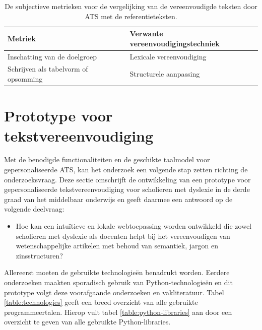 \begin{center}
	\begin{table}[H]
		\begin{tabular}{ | m{7cm} | m{7cm} | } 
			\hline
			\textbf{Metriek} & \textbf{Verwante vereenvoudigingstechniek} \\
			\hline
			Inschatting van de doelgroep & Lexicale vereenvoudiging \\
			\hline
			Schrijven als tabelvorm of opsomming & Structurele aanpassing \\
			\hline
		\end{tabular}
	\caption{De subjectieve metrieken voor de vergelijking van de vereenvoudigde teksten door ATS met de referentieteksten.}
	\label{table:verg-studie-reftekst-metrieken}
	\end{table}
\end{center}

\section{Prototype voor tekstvereenvoudiging}

Met de benodigde functionaliteiten en de geschikte taalmodel voor gepersonaliseerde ATS, kan het onderzoek een volgende stap zetten richting de onderzoeksvraag. Deze sectie omschrijft de ontwikkeling van een prototype voor gepersonaliseerde tekstvereenvoudiging voor scholieren met dyslexie in de derde graad van het middelbaar onderwijs en geeft daarmee een antwoord op de volgende deelvraag: 

\begin{itemize}
	\item Hoe kan een intuïtieve en lokale webtoepassing worden ontwikkeld die zowel scholieren met dyslexie als docenten helpt bij het vereenvoudigen van wetenschappelijke artikelen met behoud van semantiek, jargon en zinsstructuren?
\end{itemize}

Allereerst moeten de gebruikte technologieën benadrukt worden. Eerdere onderzoeken maakten sporadisch gebruik van Python-technologieën en dit prototype volgt deze voorafgaande onderzoeken en vakliteratuur. Tabel \ref{table:technologies} geeft een breed overzicht van alle gebruikte programmeertalen. Hierop vult tabel \ref{table:python-libraries} aan door een overzicht te geven van alle gebruikte Python-libraries.

